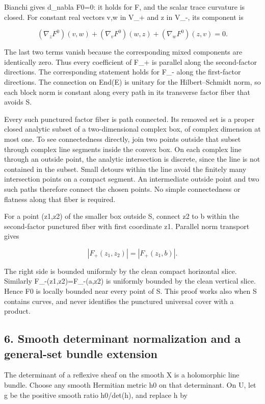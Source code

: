 Bianchi gives d\_nabla F0=0: it holds for F, and the scalar trace
curvature is closed. For constant real vectors v,w in V\_+ and z in
V\_-, its component is

\[
 (\nabla_zF^0)(v,w)+(\nabla_vF^0)(w,z)
                      +(\nabla_wF^0)(z,v)=0.
 \tag{E834.11}
\]

The last two terms vanish because the corresponding mixed components are
identically zero. Thus every coefficient of F\_+ is parallel along the
second-factor directions. The corresponding statement holds for F\_-
along the first-factor directions. The connection on End(E) is unitary
for the Hilbert--Schmidt norm, so each block norm is constant along
every path in its transverse factor fiber that avoids S.

Every such punctured factor fiber is path connected. Its removed set is
a proper closed analytic subset of a two-dimensional complex box, of
complex dimension at most one. To see connectedness directly, join two
points outside that subset through complex line segments inside the
convex box. On each complex line through an outside point, the analytic
intersection is discrete, since the line is not contained in the subset.
Small detours within the line avoid the finitely many intersection
points on a compact segment. An intermediate outside point and two such
paths therefore connect the chosen points. No simple connectedness or
flatness along that fiber is required.

For a point (z1,z2) of the smaller box outside S, connect z2 to b within
the second-factor punctured fiber with first coordinate z1. Parallel
norm transport gives

\[
 |F_+(z_1,z_2)|=|F_+(z_1,b)|.
 \tag{E834.12}
\]

The right side is bounded uniformly by the clean compact horizontal
slice. Similarly
\textbar F\_-(z1,z2)\textbar=\textbar F\_-(a,z2)\textbar{} is uniformly
bounded by the clean vertical slice. Hence F0 is locally bounded near
every point of S. This proof works also when S contains curves, and
never identifies the punctured universal cover with a product.

\subsection{6. Smooth determinant normalization and a general-set bundle
extension}\label{SF-E834:smooth-determinant-normalization-and-a-general-set-bundle-extension}

The determinant of a reflexive sheaf on the smooth X is a holomorphic
line bundle. Choose any smooth Hermitian metric h0 on that determinant.
On U, let g be the positive smooth ratio h0/det(h), and replace h by

